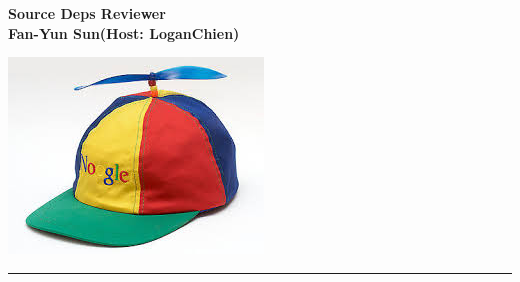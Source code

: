 \documentclass[12pt, portrait]{article}
\begin{document}
\hspace{100pt}
\begin{minipage}[t]{0.4\linewidth}
  \vspace{-70pt}
  \color{primary} \Huge \textbf{Source Deps Reviewer} \\ %
  \color{Black} \Large \textbf{Fan-Yun Sun(Host: LoganChien)}\\ %
\end{minipage}
\hspace{50pt}
\begin{minipage}[t]{0.2\linewidth}
  \includegraphics[width=\linewidth]{noogler.jpg}
\end{minipage}

\noindent\textcolor{primary}{\rule{\linewidth}{3pt}}
\color{DarkSlateGray}
\end{document}
